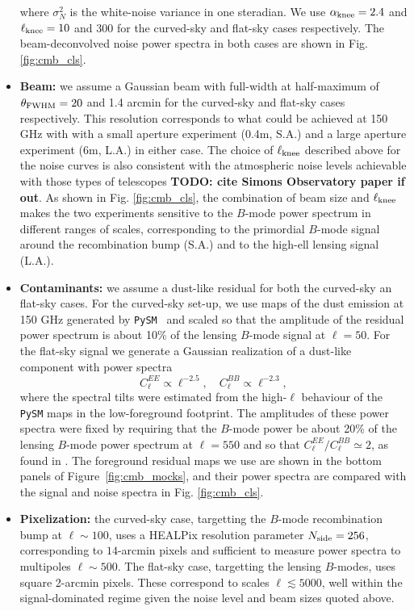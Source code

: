 \documentclass[usenatbib]{mnrasb}
\newcommand{\todo}[1]{{\bf TODO: #1}}
\newcommand{\todo}[1]{}
\begin{document}
\begin{itemize}
          where $\sigma_N^2$ is the white-noise variance in one steradian. We use $\alpha_{\rm knee}=2.4$ and $\ell_{\rm knee}=10$ and 300 for the curved-sky and flat-sky cases respectively. The beam-deconvolved noise power spectra in both cases are shown in Fig. \ref{fig:cmb_cls}.
          \item {\bf Beam:} we assume a Gaussian beam with full-width at half-maximum of $\theta_{\rm FWHM}=20$ and 1.4 arcmin for the curved-sky and flat-sky cases respectively. This resolution corresponds to what could be achieved at 150 GHz with with a small aperture experiment (0.4m, S.A.) and a large aperture experiment (6m, L.A.) in either case. The choice of $\ell_{\rm knee}$ described above for the noise curves is also consistent with the atmospheric noise levels achievable with those types of telescopes \todo{cite Simons Observatory paper if out}. As shown in Fig. \ref{fig:cmb_cls}, the combination of beam size and $\ell_{\rm knee}$ makes the two experiments sensitive to the $B$-mode power spectrum in different ranges of scales, corresponding to the primordial $B$-mode signal around the recombination bump (S.A.) and to the high-ell lensing signal (L.A.).
          \item {\bf Contaminants:} we assume a dust-like residual for both the curved-sky an flat-sky cases. For the curved-sky set-up, we use maps of the dust emission at 150 GHz generated by {\tt PySM}~\citep{2017MNRAS.469.2821T} and scaled so that the amplitude of the residual power spectrum is about 10\% of the lensing $B$-mode signal at $\ell=50$. For the flat-sky signal we generate a Gaussian realization of a dust-like component with power spectra
          \begin{equation}
            C_\ell^{EE}\propto\ell^{-2.5},\hspace{12pt}
            C_\ell^{BB}\propto\ell^{-2.3},
          \end{equation}
          where the spectral tilts were estimated from the high-$\ell$ behaviour of the {\tt PySM} maps in the low-foreground footprint. The amplitudes of these power spectra were fixed by requiring that the $B$-mode power be about 20\% of the lensing $B$-mode power spectrum at $\ell=550$ and so that $C_\ell^{EE}/C_\ell^{BB}\simeq2$, as found in \citet{2016A&A...594A..13P}. The foreground residual maps we use are shown in the bottom panels of Figure~\ref{fig:cmb_mocks}, and their power spectra are compared with the signal and noise spectra in Fig. \ref{fig:cmb_cls}.
          \item {\bf Pixelization:} the curved-sky case, targetting the $B$-mode recombination bump at $\ell\sim100$, uses a HEALPix resolution parameter $N_{\rm side}=256$, corresponding to $14$-arcmin pixels and sufficient to measure power spectra to multipoles $\ell\sim500$. The flat-sky case, targetting the lensing $B$-modes, uses square 2-arcmin pixels. These correspond to scales $\ell\lesssim5000$, well within the signal-dominated regime given the noise level and beam sizes quoted above.
        \end{itemize}
\end{document}
